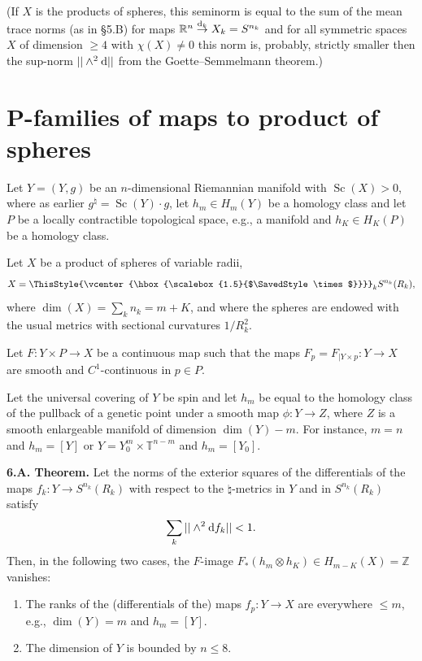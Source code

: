 \documentclass[pdftex]{sigma}
\numberwithin{equation}{section}
\newcommand\bigtimes{\mathbin{\ThisStyle{\vcenter{\hbox{%
\scalebox{1.5}{$\SavedStyle\times$}}}}}}
\begin{document}
 (If $X$ is the products of spheres, this seminorm is equal to the sum of the mean trace norms (as in \S5.B) for maps
 $\mathbb R^n\overset {{\rm d}_k}\to X_k=S^{n_k}$ and for
 all symmetric spaces $X$ of dimension $\geq 4$ with $\chi(X)\neq 0$ this norm is, probably, strictly smaller then the sup-norm $||\wedge^2{\rm d}||$ from the Goette--Semmelmann theorem.)

\section[P-families of maps to product of spheres]{$\boldsymbol{P}$-families of maps to product of spheres}\label{section6}

Let $Y=(Y,g) $ be an $n$-dimensional Riemannian manifold with $\operatorname{Sc}(X)>0$, where as earlier
$g^\natural =\operatorname{Sc}(Y)\cdot g$,
 let $h_m\in H_m(Y)$ be a homology class and let $P$ be a locally contractible topological space, e.g., a manifold and $h_K\in H_K(P)$ be a homology class.

Let $X$ be a product of spheres of variable radii,
\[
X=\bigtimes _kS^{n_k}(R_k),
\]
where $\dim(X)=\sum_kn_k=m+K$, and where the spheres are endowed with the usual metrics with sectional curvatures $1/R_k^2$.

 Let $F\colon Y \times P\to X$ be a continuous map such that
 the maps $F_p=F_{|Y\times p}\colon Y\to X$ are smooth and $C^1$-continuous in $p\in P$.

Let the universal covering of $Y$ be spin and let $h_m$ be equal to the homology class of the pullback of a genetic point under a smooth map $\phi\colon Y\to Z$, where $Z$ is a smooth enlargeable manifold of
 dimension $\dim(Y)-m$. For instance, $m=n$ and $h_m=[Y]$ or
 $Y =Y_0^m\times \mathbb T^{n-m}$ and $h_m=[Y_0]$.

\textbf {6.A. Theorem.}  Let the norms of the exterior squares of the differentials of the maps $f_k\colon Y\to S^{n_k}(R_k)$ with respect to the $\natural$-metrics in $Y$ and in $S^{n_k}(R_k)$ satisfy
\begin{equation*}
\sum_k||\wedge^2{\rm d}f_k||< 1. %
\end{equation*}
 Then, in the following two cases,
the $F$-image $F_\ast(h_m\otimes h_K)\in H_{m-K}(X)=\mathbb Z$ vanishes:
\begin{enumerate}\itemsep=0pt
\item[(1)] The ranks of the (differentials of the) maps $f_{p}\colon Y\to X$ are everywhere $\leq m$, e.g., $\dim(Y)=m$ and $h_m=[Y]$.
\item[(2)] The dimension of $Y$ is bounded by $n\leq 8$.
\end{enumerate}
\end{document}
